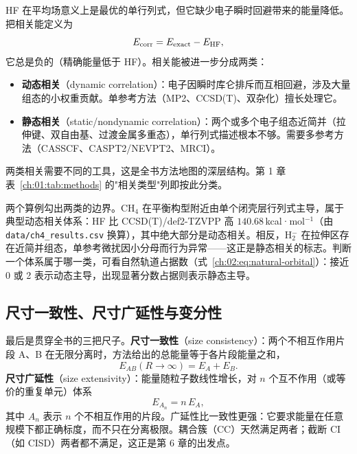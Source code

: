 HF 在平均场意义上是最优的单行列式，但它缺少电子瞬时回避带来的能量降低。把相关能定义为\citep{lowdin1959corr}
\begin{equation}
E_{\mathrm{corr}} = E_{\mathrm{exact}} - E_{\mathrm{HF}},
\label{ch:02:eq:corr-energy}
\end{equation}
它总是负的（精确能量低于 HF）。相关能被进一步分成两类：

\begin{itemize}
  \item \textbf{动态相关}（dynamic correlation）：电子因瞬时库仑排斥而互相回避，涉及大量组态的小权重贡献。单参考方法（MP2、CCSD(T)、双杂化）擅长处理它。
  \item \textbf{静态相关}（static/nondynamic correlation）：两个或多个电子组态近简并（拉伸键、双自由基、过渡金属多重态），单行列式描述根本不够。需要多参考方法（CASSCF、CASPT2/NEVPT2、MRCI）。
\end{itemize}

两类相关需要不同的工具，这是全书方法地图的深层结构。第 1 章表~\ref{ch:01:tab:methods} 的"相关类型"列即按此分类。

两个算例勾出两类的边界。CH$_4$ 在平衡构型附近由单个闭壳层行列式主导，属于典型动态相关体系：HF 比 CCSD(T)/def2-TZVPP 高 $140.68$\,kcal·mol$^{-1}$（由 \texttt{data/ch4\_results.csv} 换算），其中绝大部分是动态相关。相反，H$_2^-$ 在拉伸区存在近简并组态，单参考微扰因小分母而行为异常——这正是静态相关的标志。判断一个体系属于哪一类，可看自然轨道占据数（式~\eqref{ch:02:eq:natural-orbital}）：接近 0 或 2 表示动态主导，出现显著分数占据则表示静态主导。

\subsection{尺寸一致性、尺寸广延性与变分性}
\label{ch:02:sec:size}

最后是贯穿全书的三把尺子。\textbf{尺寸一致性}（size consistency）：两个不相互作用片段 A、B 在无限分离时，方法给出的总能量等于各片段能量之和，
\begin{equation}
E_{AB}(R\to\infty) = E_A + E_B .
\label{ch:02:eq:size-consistency}
\end{equation}
\textbf{尺寸广延性}（size extensivity）：能量随粒子数线性增长，对 $n$ 个互不作用（或等价的重复单元）体系
\begin{equation}
E_{A_n} = n\,E_A ,
\label{ch:02:eq:size-extensivity}
\end{equation}
其中 $A_n$ 表示 $n$ 个不相互作用的片段。广延性比一致性更强：它要求能量在任意规模下都正确标度，而不只在分离极限。耦合簇（CC）天然满足两者；截断 CI（如 CISD）两者都不满足，这正是第 6 章的出发点。

